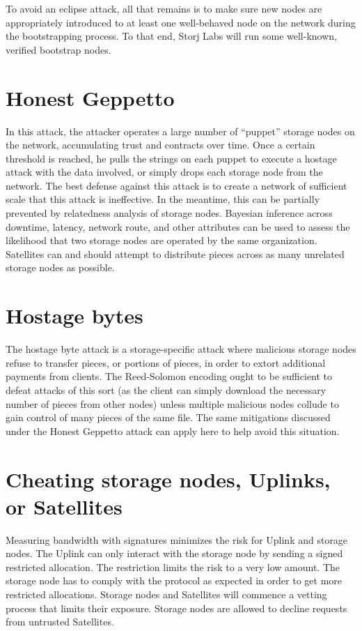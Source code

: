 \documentclass[8pt,fleqn,openany]{book}
\begin{document}
To avoid an eclipse attack, all that remains
is to make sure new nodes are appropriately introduced to at least one
well-behaved node on the network during the bootstrapping process.
To that end, Storj Labs will run some well-known, verified bootstrap nodes.

\section{Honest Geppetto}

In this attack,
the attacker operates a large number of ``puppet'' storage nodes on the network,
accumulating trust and contracts over time. Once a certain threshold is reached,
he pulls the strings on each puppet to execute a hostage attack with the data
involved, or simply drops each storage node from the network. The best defense
against this attack is to create a network of sufficient scale that this attack
is ineffective. In the meantime, this can be partially prevented by relatedness
analysis of storage nodes. Bayesian inference across downtime, latency, network
route, and other
attributes can be used to assess the likelihood that two storage nodes are
operated by the same organization. Satellites can and should attempt to
distribute pieces across as many unrelated storage nodes as possible.

\section{Hostage bytes}

The hostage byte attack is a storage-specific attack where malicious storage
nodes
refuse to transfer pieces, or portions of pieces, in order to extort additional
payments from clients. The Reed-Solomon encoding ought to be sufficient to
defeat attacks of this sort (as the client can simply download the necessary
number of pieces from other nodes) unless multiple malicious nodes collude to
gain control of many pieces of the same file. The same mitigations discussed
under the Honest Geppetto attack can apply here to help avoid this situation.

\section{Cheating storage nodes, Uplinks, or Satellites}

Measuring bandwidth with signatures minimizes the risk for Uplink and storage
nodes.
The Uplink can only interact with the storage node by sending a signed
restricted allocation.
The restriction limits the risk to a very low amount.
The storage node has to comply with the protocol as expected in order to get
more restricted allocations.
Storage nodes and Satellites will commence a vetting process that limits their
exposure.
Storage nodes are allowed to decline requests from untrusted Satellites.
\end{document}
